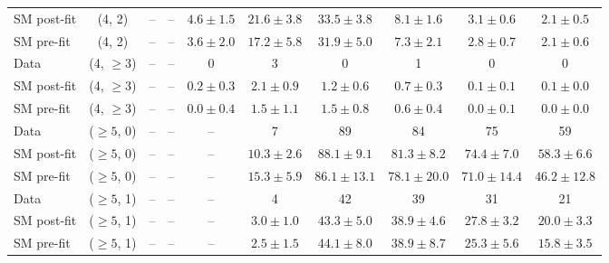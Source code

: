 {\begin{table}[h!]
{\begin{tabular}{lccccccccc}
    SM post-fit & (4, 2)           & --                  & --                  & $4.6\pm{ 1.5 }$    & $21.6\pm{ 3.8 }$   & $33.5\pm{ 3.8 }$   & $8.1\pm{ 1.6 }$    & $3.1\pm{ 0.6 }$   & $2.1\pm{ 0.5 }$   \\[0.5ex] 
    SM pre-fit  & (4, 2)           & --                  & --                  & $3.6\pm{ 2.0 }$    & $17.2\pm{ 5.8 }$   & $31.9\pm{ 5.0 }$   & $7.3\pm{ 2.1 }$    & $2.8\pm{ 0.7 }$   & $2.1\pm{ 0.6 }$   \\[0.5ex] 
    Data        & (4, $\ge3$)      & --                  & --                  & 0                  & 3                  & 0                  & 1                  & 0                 & 0                 \\[0.5ex] 
    SM post-fit & (4, $\ge3$)      & --                  & --                  & $0.2\pm{ 0.3 }$    & $2.1\pm{ 0.9 }$    & $1.2\pm{ 0.6 }$    & $0.7\pm{ 0.3 }$    & $0.1\pm{ 0.1 }$   & $0.1\pm{ 0.0 }$   \\[0.5ex] 
    SM pre-fit  & (4, $\ge3$)      & --                  & --                  & $0.0\pm{ 0.4 }$    & $1.5\pm{ 1.1 }$    & $1.5\pm{ 0.8 }$    & $0.6\pm{ 0.4 }$    & $0.0\pm{ 0.1 }$   & $0.0\pm{ 0.0 }$   \\[0.5ex] 
    Data        & ($\ge5$, 0)      & --                  & --                  & --                 & 7                  & 89                 & 84                 & 75                & 59                \\[0.5ex] 
    SM post-fit & ($\ge5$, 0)      & --                  & --                  & --                 & $10.3\pm{ 2.6 }$   & $88.1\pm{ 9.1 }$   & $81.3\pm{ 8.2 }$   & $74.4\pm{ 7.0 }$  & $58.3\pm{ 6.6 }$  \\[0.5ex] 
    SM pre-fit  & ($\ge5$, 0)      & --                  & --                  & --                 & $15.3\pm{ 5.9 }$   & $86.1\pm{ 13.1 }$  & $78.1\pm{ 20.0 }$  & $71.0\pm{ 14.4 }$ & $46.2\pm{ 12.8 }$ \\[0.5ex] 
    Data        & ($\ge5$, 1)      & --                  & --                  & --                 & 4                  & 42                 & 39                 & 31                & 21                \\[0.5ex] 
    SM post-fit & ($\ge5$, 1)      & --                  & --                  & --                 & $3.0\pm{ 1.0 }$    & $43.3\pm{ 5.0 }$   & $38.9\pm{ 4.6 }$   & $27.8\pm{ 3.2 }$  & $20.0\pm{ 3.3 }$  \\[0.5ex] 
    SM pre-fit  & ($\ge5$, 1)      & --                  & --                  & --                 & $2.5\pm{ 1.5 }$    & $44.1\pm{ 8.0 }$   & $38.9\pm{ 8.7 }$   & $25.3\pm{ 5.6 }$  & $15.8\pm{ 3.5 }$  \\[0.5ex] 

\end{tabular}}
\end{table}}
